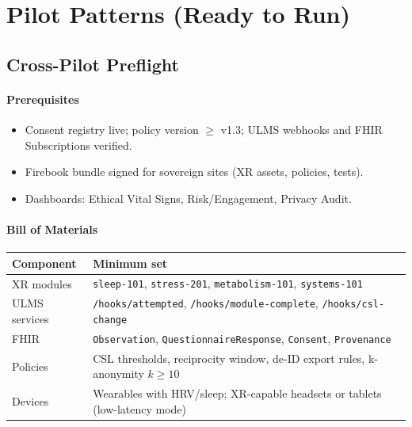 \documentclass[11pt]{article}
\theoremstyle{plain}
\begin{document}
\section{Pilot Patterns (Ready to Run)}

\subsection{Cross-Pilot Preflight}
\paragraph{Prerequisites}
\begin{itemize}
  \item Consent registry live; policy version $\ge$ v1.3; ULMS webhooks and FHIR Subscriptions verified.
  \item Firebook bundle signed for sovereign sites (XR assets, policies, tests).
  \item Dashboards: Ethical Vital Signs, Risk/Engagement, Privacy Audit.
\end{itemize}

\paragraph{Bill of Materials}
\begin{center}
\begin{tabular}{l l}
\hline
Component & Minimum set \\
\hline
XR modules & \texttt{sleep-101}, \texttt{stress-201}, \texttt{metabolism-101}, \texttt{systems-101} \\
ULMS services & \texttt{/hooks/attempted}, \texttt{/hooks/module-complete}, \texttt{/hooks/csl-change} \\
FHIR & \texttt{Observation}, \texttt{QuestionnaireResponse}, \texttt{Consent}, \texttt{Provenance} \\
Policies & CSL thresholds, reciprocity window, de-ID export rules, k-anonymity $k\ge10$ \\
Devices & Wearables with HRV/sleep; XR-capable headsets or tablets (low-latency mode) \\
\hline
\end{tabular}
\end{center}
\end{document}
